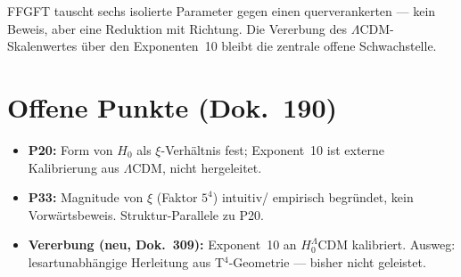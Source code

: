 \medskip
FFGFT tauscht sechs isolierte Parameter gegen einen querverankerten —
kein Beweis, aber eine Reduktion mit Richtung. Die Vererbung des
$\Lambda$CDM-Skalenwertes über den Exponenten~10 bleibt die
zentrale offene Schwachstelle.

\chapter{Offene Punkte (Dok.~190)}

\begin{itemize}
  \item \textbf{P20:} Form von $H_0$ als $\xi$-Verhältnis fest;
        Exponent~10 ist externe Kalibrierung aus $\Lambda$CDM,
        nicht hergeleitet.
  \item \textbf{P33:} Magnitude von $\xi$ (Faktor $5^4$) intuitiv/
        empirisch begründet, kein Vorwärtsbeweis. Struktur-Parallele
        zu P20.
  \item \textbf{Vererbung (neu, Dok.~309):} Exponent~10 an
        $H_0^\Lambda$CDM kalibriert. Ausweg: lesartunabhängige
        Herleitung aus T$^4$-Geometrie — bisher nicht geleistet.
\end{itemize}
